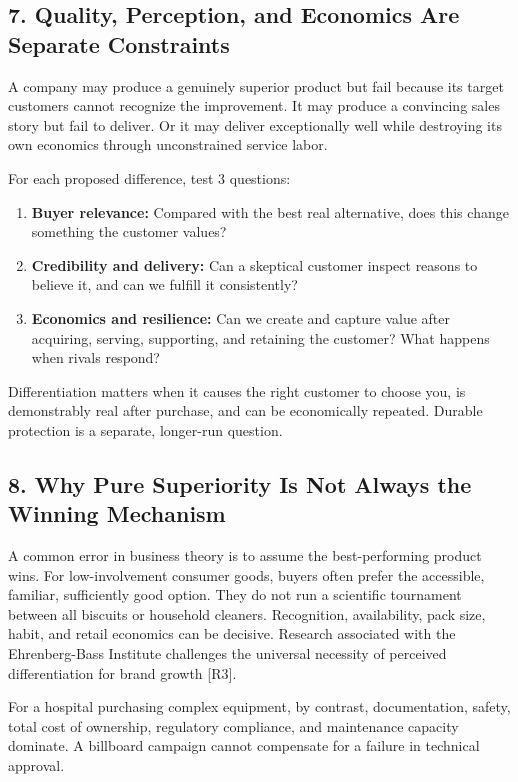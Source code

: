 \subsection*{7. Quality, Perception, and Economics Are Separate Constraints}

A company may produce a genuinely superior product but fail because its target customers cannot recognize the improvement. It may produce a convincing sales story but fail to deliver. Or it may deliver exceptionally well while destroying its own economics through unconstrained service labor.

For each proposed difference, test 3 questions:

\begin{enumerate}
    \item \textbf{Buyer relevance:} Compared with the best real alternative, does this change something the customer values?
    \item \textbf{Credibility and delivery:} Can a skeptical customer inspect reasons to believe it, and can we fulfill it consistently?
    \item \textbf{Economics and resilience:} Can we create and capture value after acquiring, serving, supporting, and retaining the customer? What happens when rivals respond?
\end{enumerate}

Differentiation matters when it causes the right customer to choose you, is demonstrably real after purchase, and can be economically repeated. Durable protection is a separate, longer-run question.

\subsection*{8. Why Pure Superiority Is Not Always the Winning Mechanism}

A common error in business theory is to assume the best-performing product wins. For low-involvement consumer goods, buyers often prefer the accessible, familiar, sufficiently good option. They do not run a scientific tournament between all biscuits or household cleaners. Recognition, availability, pack size, habit, and retail economics can be decisive. Research associated with the Ehrenberg-Bass Institute challenges the universal necessity of perceived differentiation for brand growth [R3].

For a hospital purchasing complex equipment, by contrast, documentation, safety, total cost of ownership, regulatory compliance, and maintenance capacity dominate. A billboard campaign cannot compensate for a failure in technical approval.

